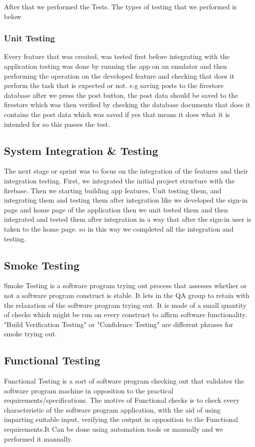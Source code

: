 After that we performed the Tests. The types of testing that we performed is below
\subsubsection{Unit Testing}
Every feature that was created, was tested first before integrating with the application testing was done by running the app on an emulator and then performing the operation on the developed feature and checking that does it perform the task that is expected or not. e.g saving posts to the firestore database after we press the post button, the post data should be saved to the firestore which was then verified by checking the database documents that does it contains the post data which was saved if yes that means it does what it is intended for so this passes the test.

\subsection{System Integration \& Testing}
The next stage or sprint was to focus on the integration of the features and their integration testing. First, we integrated the initial project structure with the firebase. Then we starting building app features, Unit testing them, and integrating them and testing them after integration like we developed the sign-in page and home page of the application then we unit tested them and then integrated and tested them after integration in a way that after the sign-in user is taken to the home page. so in this way we completed all the integration and testing.

\subsection{Smoke Testing}
Smoke Testing is a software program trying out process that assesses whether or not a software program construct is stable. It lets in the QA group to retain with the relaxation of the software program trying out. It is made of a small quantity of checks which might be run on every construct to affirm software functionality. "Build Verification Testing" or "Confidence Testing" are different phrases for smoke trying out.
\subsection{Functional Testing}
Functional Testing is a sort of software program checking out that validates the software program machine in opposition to the practical requirements/specifications. The motive of Functional checks is to check every characteristic of the software program application, with the aid of using imparting suitable input, verifying the output in opposition to the Functional requirements.It Can be done using automation tools or manually and we performed it manually.
